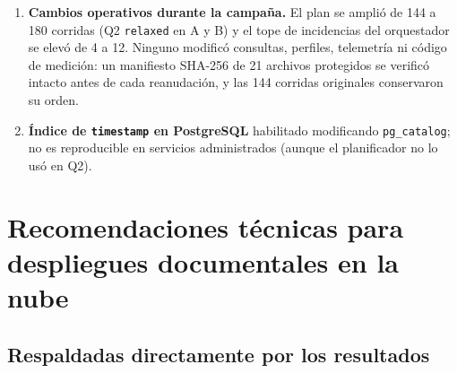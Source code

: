 \documentclass[11pt,a4paper]{article}
\begin{document}
\begin{enumerate}[label=\textbf{\arabic*.}]
  \item \textbf{Cambios operativos durante la campaña.} El plan se amplió de 144 a 180 corridas (Q2 \texttt{relaxed} en A y B) y el tope de incidencias del orquestador se elevó de 4 a 12. Ninguno modificó consultas, perfiles, telemetría ni código de medición: un manifiesto SHA-256 de 21 archivos protegidos se verificó intacto antes de cada reanudación, y las 144 corridas originales conservaron su orden.
  \item \textbf{Índice de \texttt{timestamp} en PostgreSQL} habilitado modificando \texttt{pg\_catalog}; no es reproducible en servicios administrados (aunque el planificador no lo usó en Q2).
\end{enumerate}

\section{Recomendaciones técnicas para despliegues documentales en la nube}\label{sec:recomendaciones}

\subsection{Respaldadas directamente por los resultados}
\end{document}
